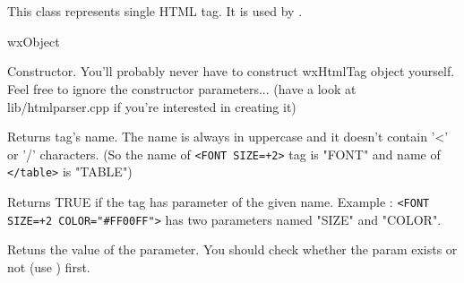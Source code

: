 %
%


\section{}\label{wxhtmltag}

This class represents single HTML tag. 
It is used by .



wxObject



\label{wxhtmltagwxhtmltag}


Constructor. You'll probably never have to construct wxHtmlTag object
yourself. Feel free to ignore the constructor parameters...
(have a look at lib/htmlparser.cpp if you're interested in creating it)

\label{wxhtmltaggetname}


Returns tag's name. The name is always in uppercase and it doesn't contain
'<' or '/' characters. (So the name of {\tt <FONT SIZE=+2>} tag is "FONT"
and name of {\tt </table>} is "TABLE")


\label{wxhtmltaghasparam}


Returns TRUE if the tag has parameter of the given name. 
Example : {\tt <FONT SIZE=+2 COLOR="\#FF00FF">} has two parameters named
"SIZE" and "COLOR".



\label{wxhtmltaggetparam}


Retuns the value of the parameter. You should check whether the
param exists or not (use ) first.


